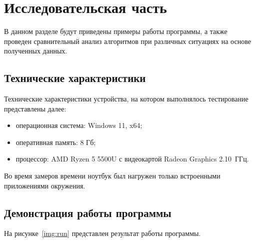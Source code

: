 \chapter{Исследовательская часть}

В данном разделе будут приведены примеры работы программы, а также проведен сравнительный анализ алгоритмов при различных ситуациях на основе полученных данных.

\section{Технические характеристики}

Технические характеристики устройства, на котором выполнялось тестирование представлены далее:
\begin{itemize}[label={---}]
	\item операционная система: Windows 11, x64;
	\item оперативная память: 8 Гб;
	\item процессор: AMD Ryzen 5 5500U с видеокартой Radeon Graphics 2.10~ГГц.
\end{itemize}

Во время замеров времени ноутбук был нагружен только встроенными приложениями окружения.

\section{Демонстрация работы программы}

На рисунке~\ref{img:run} представлен результат работы программы.

